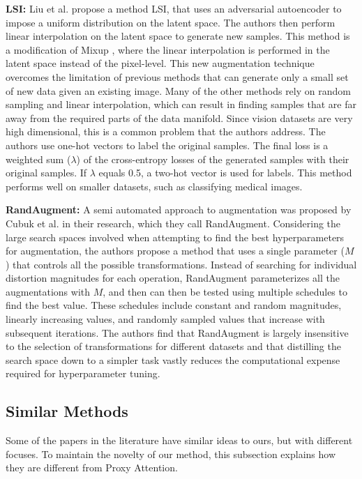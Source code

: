 \textbf{LSI: }
Liu et al. \cite{liuDataAugmentationLatent2018} propose a method LSI, that uses an adversarial autoencoder to impose a uniform distribution on the latent space. The authors then perform linear interpolation on the latent space to generate new samples. This method is a modification of Mixup \cite{zhangMixupEmpiricalRisk2018}, where the linear interpolation is performed in the latent space instead of the pixel-level. This new augmentation technique overcomes the limitation of previous methods that can generate only a small set of new data given an existing image. Many of the other methods rely on random sampling and linear interpolation, which can result in finding samples that are far away from the required parts of the data manifold. Since vision datasets are very high dimensional, this is a common problem that the authors address. The authors use one-hot vectors to label the original samples. The final loss is a weighted sum ($\lambda$) of the cross-entropy losses of the generated samples with their original samples. If $\lambda$ equals 0.5, a two-hot vector is used for labels. This method performs well on smaller datasets, such as classifying medical images.

\textbf{RandAugment: }
A semi automated approach to augmentation was proposed by Cubuk et al. \cite{cubukRandaugmentPracticalAutomated2020} in their research, which they call RandAugment. Considering the large search spaces involved when attempting to find the best hyperparameters for augmentation, the authors propose a method that uses a single parameter ($M$) that controls all the possible transformations. Instead of searching for individual distortion magnitudes for each operation, RandAugment parameterizes all the augmentations with $M$, and then can then be tested using multiple schedules to find the best value. These schedules include constant and random magnitudes, linearly increasing values, and randomly sampled values that increase with subsequent iterations. The authors find that RandAugment is largely insensitive to the selection of transformations for different datasets and that distilling the search space down to a simpler task vastly reduces the computational expense required for hyperparameter tuning.


\subsection{Similar Methods}
Some of the papers in the literature have similar ideas to ours, but with different focuses. To maintain the novelty of our method, this subsection explains how they are different from Proxy Attention.

